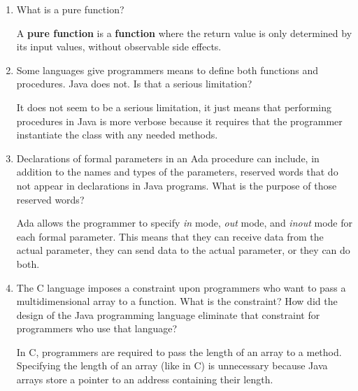 \begin{enumerate}
\begin{answer}
\end{answer}


  \item What is a pure function?

\begin{answer}

A \textbf{pure function} is a \textbf{function} where the return value is only determined by its input values, without observable side effects.

\end{answer}

  \item Some languages give programmers means to define
    both functions and procedures. Java does not. Is that
    a serious limitation?

\begin{answer}

It does not seem to be a serious limitation, it just means that performing procedures in Java is more verbose because it requires that the programmer instantiate the class with any needed methods.

\end{answer}


  \item Declarations of formal parameters in an Ada procedure
    can include, in addition to the names and types of the
    parameters, reserved words that do not appear in declarations
    in Java programs. 
    What is the purpose of those reserved words?

\begin{answer}

    Ada allows the programmer to specify \textit{in} mode, \textit{out} mode, and \textit{inout} mode for each formal parameter.  This means that they can receive data from the actual parameter, they can send data to the actual parameter, or they can do both.
    
\end{answer}
 
  \item The C language imposes a constraint upon programmers
    who want to pass a multidimensional array to a function.
    What is the constraint? How did the design of the Java
    programming language eliminate that constraint for 
    programmers who use that language?

\begin{answer}

In C, programmers are required to pass the length of an array to a method. Specifying the length of an array (like in C) is unnecessary because Java arrays store a pointer to an address containing their length.


\end{answer}
\end{enumerate}
